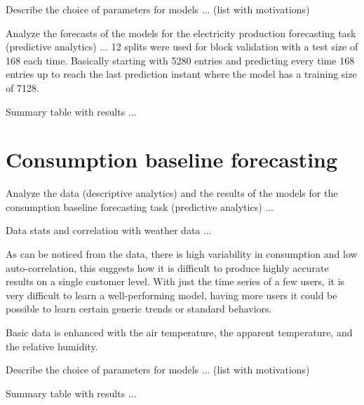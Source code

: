 Describe the choice of parameters for models ... (list with motivations)

Analyze the forecasts of the models for the electricity production forecasting task (predictive analytics) ...
12 splits were used for block validation with a test size of 168 each time.
Basically starting with 5280 entries and predicting every time 168 entries up to reach the last prediction instant where the model has a training size of 7128.

Summary table with results ...


\section{Consumption baseline forecasting} 
\label{sec:baselineval}
\vspace{0.2 cm}

Analyze the data (descriptive analytics) and the results of the models for the consumption baseline forecasting task (predictive analytics) ...

Data stats and correlation with weather data ...

As can be noticed from the data, there is high variability in consumption and low auto-correlation, this suggests how it is difficult to produce highly accurate results on a single customer level.
With just the time series of a few users, it is very difficult to learn a well-performing model, having more users it could be possible to learn certain generic trends or standard behaviors.

Basic data is enhanced with the air temperature, the apparent temperature, and the relative humidity.

Describe the choice of parameters for models ... (list with motivations)

Summary table with results ...
